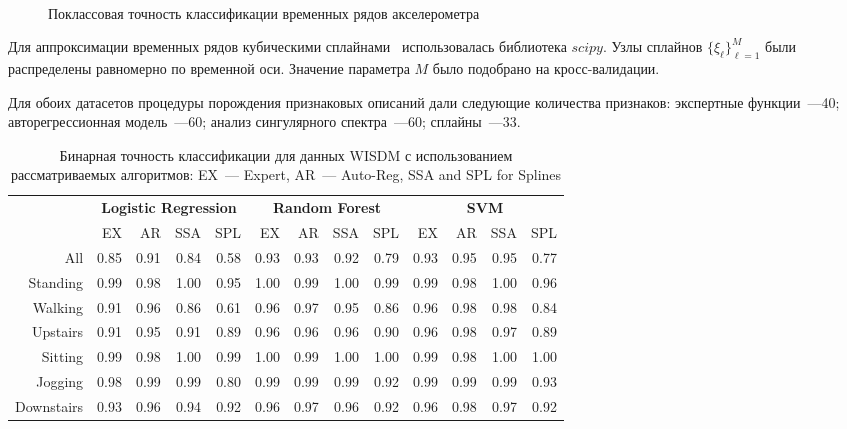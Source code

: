 \begin{figure}[!ht]
	\\
	\caption{Поклассовая точность классификации временных рядов акселерометра}
	\label{ch5:fig:feature_union_results}
\end{figure}

Для аппроксимации временных рядов кубическими сплайнами~\cite{deboor1978splines} использовалась библиотека $scipy$. 
Узлы сплайнов $\{\xi_{\ell}\}_{\ell = 1}^M$ были распределены равномерно по временной оси.
Значение параметра $M$ было подобрано на кросс-валидации.

Для обоих датасетов процедуры порождения признаковых описаний дали следующие количества признаков: экспертные функции~---40; авторегрессионная модель~---60; анализ сингулярного спектра~---60; сплайны~---33.

\begin{table}[!ht]
	\centering
	\caption{Бинарная точность классификации для данных WISDM с использованием рассматриваемых алгоритмов: EX~--- Expert, AR~--- Auto-Reg, SSA and  SPL for Splines}
	\footnotesize
	\begin{tabular}{r|rrrr|rrrr|rrrr|}
		& \multicolumn{4}{c|}{\textbf{Logistic Regression}} & \multicolumn{4}{c|}{\textbf{Random Forest}} & \multicolumn{4}{c|}{\textbf{SVM}}          \\ \cline{2-13} 
		& EX   & AR   & SSA   & SPL  & EX  & AR & SSA & SPL & EX & AR & SSA & SPL \\ \hline
		All& 0.85 & 0.91 & 0.84 & 0.58 & 0.93 & 0.93 & 0.92 & 0.79 & 0.93 & 0.95 & 0.95 & 0.77 \\
		Standing& 0.99 & 0.98 & 1.00 & 0.95 & 1.00 & 0.99 & 1.00 & 0.99 & 0.99 & 0.98 & 1.00 & 0.96 \\
		Walking& 0.91 & 0.96 & 0.86 & 0.61 & 0.96 & 0.97 & 0.95 & 0.86 & 0.96 & 0.98 & 0.98 & 0.84 \\
		Upstairs& 0.91 & 0.95 & 0.91 & 0.89 & 0.96 & 0.96 & 0.96 & 0.90 & 0.96 & 0.98 & 0.97 & 0.89 \\
		Sitting& 0.99 & 0.98 & 1.00 & 0.99 & 1.00 & 0.99 & 1.00 & 1.00 & 0.99 & 0.98 & 1.00 & 1.00 \\
		Jogging& 0.98 & 0.99 & 0.99 & 0.80 & 0.99 & 0.99 & 0.99 & 0.92 & 0.99 & 0.99 & 0.99 & 0.93 \\
		Downstairs& 0.93 & 0.96 & 0.94 & 0.92 & 0.96 & 0.97 & 0.96 & 0.92 & 0.96 & 0.98 & 0.97 & 0.92 \\ \hline
	\end{tabular}
	\label{ch5:tbl:wisdm_methods_results}
\end{table}

